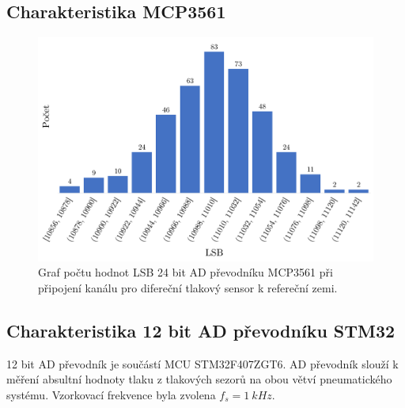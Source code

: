\subsection{Charakteristika MCP3561}
\begin{figure}[H]
    \caption{Graf počtu hodnot LSB 24 bit AD převodníku MCP3561 při připojení kanálu
        pro difereční tlakový sensor k refereční zemi.}
    \includegraphics[width=1\textwidth]{graphs/mcp_gnd.png}
\end{figure}
\subsection{Charakteristika 12 bit AD převodníku STM32}
12 bit AD převodník je součástí MCU STM32F407ZGT6. AD převodník slouží k měření absultní hodnoty tlaku z tlakových sezorů na obou větví pneumatického systému. Vzorkovací frekvence byla zvolena $f_s = 1 \ kHz$.

